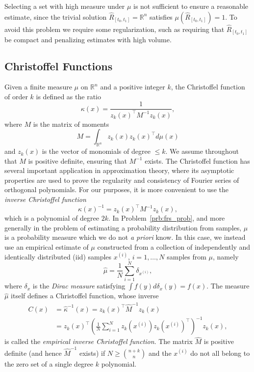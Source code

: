 \documentclass[letterpaper, 10 pt, conference]{ieeeconf}
\newcommand{\R}{\mathbb{R}}
\newcommand{\ars}{\ensuremath{\hat{R}_{[t_0,t_1]}}}
\begin{document}
%
Selecting a set with high measure under $\mu$ is not sufficient to
ensure a reasonable estimate, since the trivial solution $\ars=\R^n$ satisfies
$\mu(\ars)=1$. To avoid this problem we require some regularization, such as
requiring that $\ars$ be compact and penalizing estimates with high volume.
%

\subsection{Christoffel Functions}

Given a finite measure $\mu$ on $\R^n$ and a positive integer $k$,
the Christoffel function of order $k$ is defined as the ratio
\begin{equation}
    \label{eq:cfun_def}
    \kappa(x) = \frac{1}{z_k(x)^\top M^{-1}z_k(x)},
\end{equation}
where $M$ is the matrix of moments
\begin{equation*}
    M = \int_{\R^n}z_k(x) z_k(x)^\top d\mu(x)
\end{equation*}
and $z_k(x)$ is the vector of monomials of degree $\le k$.
We assume throughout that $M$ is positive definite, ensuring that $M^{-1}$
exists. The Christoffel function has several important application in
approximation theory, where its asymptotic properties are used to prove the
regularity and consistency of Fourier series of orthogonal polynomials. For our
purposes, it is more convenient to use the \emph{inverse Christoffel function}
%
%
%
\begin{equation}
    {\kappa(x)}^{-1} = z_k(x)^\top M^{-1}z_k(x),
\end{equation}
which is a polynomial of degree $2k$.
In Problem~\ref{prb:frs_prob}, and more generally in the problem of estimating
a probability distribution from samples, $\mu$ is a probability measure which we do not \emph{a priori} know. In this case, we instead use an empirical
estimate of $\mu$ constructed from a collection of independently and identically distributed (iid) samples $x^{(i)}$, $i=1,\dotsc,N$ samples from $\mu$, namely
\begin{equation*}
    \hat{\mu}=\frac{1}{N}\sum_{i=1}^N \delta_{x^{(i)}},
\end{equation*}
where $\delta_x$ is the \emph{Dirac measure} satisfying 
$\int f(y)d\delta_x(y)=f(x)$. The measure $\hat{\mu}$ itself defines a Christoffel function, whose inverse
\begin{equation}
    \label{eq:empirical_cfun_def}
    \begin{split}
    C(x)&=
    \hat{\kappa}^{-1}(x)=
    z_k(x)^\top \hat{M}^{-1}z_k(x)\\
    &= 
    z_k(x)^\top \left(
    \frac{1}{N}
    \sum_{i=1}^N 
    z_k(x^{(i)})
    z_k(x^{(i)})^\top
    \right)^{-1}z_k(x),
    \end{split}
\end{equation}
is called the \emph{empirical inverse Christoffel function}.
The matrix $\hat{M}$ is positive definite (and hence $\hat{M}^{-1}$ exists) if $N \ge \binom{n+k}{n}$ and the $x^{(i)}$ do not all belong to the zero set of a single degree $k$ polynomial.
\end{document}
